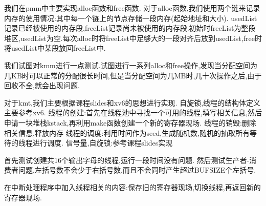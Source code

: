 \documentclass[12pt,letterpaper]{hmcpset}
\begin{document}
	\begin{problem}[1.实现pmm.c]
	\end{problem}
	\begin{solution}
	我们在pmm中主要实现alloc函数和free函数.
	对于alloc函数,我们使用两个链来记录内存的使用情况:其中每一个链上的节点存储一段内存(起始地址和大小). usedList记录已经被使用的内存段,freeList记录尚未被使用的内存段.初始时freeList为整段堆区,usedList为空.每次alloc时将freeList中足够大的一段对齐后放到usedList,free时将usedList中某段放回freeList中.
	\end{solution}

	\begin{problem}[2.测试kmm.c]
	\end{problem}
	\begin{solution}
		我们试图对kmm进行一点测试.试图进行一系列alloc和free操作,发现当分配空间为几KB时可以正常的分配很长时间,但是当分配空间为几MB时,几十次操作之后,由于回收不全,就会出现问题.
	\end{solution}	
	
	\begin{problem}[3.实现kmt.c]
	\end{problem}
	\begin{solution}
		对于kmt,我们主要根据课程slides和xv6的思想进行实现.
		自旋锁,线程的结构体定义主要参考xv6.
		线程的创建:首先在线程池中寻找一个可用的线程,填写相关信息,然后申请一块堆栈kstack,再利用make函数创建一个新的寄存器现场.
		线程的销毁:删除相关信息,释放内存
		线程的调度:利用时间作为seed,生成随机数,随机的抽取所有等待的线程进行调度.
		信号量,自旋锁:参考课程slides实现
	\end{solution}	
	
	\begin{problem}[3.测试kmt.c]
	\end{problem}
	\begin{solution}
		首先测试创建共16个输出字母的线程,运行一段时间没有问题.
		然后测试生产者-消费者问题,左括号数不会少于右括号数,而且不会同时产生超过BUFSIZE个左括号.
	\end{solution}	
	
	\begin{problem}[3.实现os.c]
	\end{problem}
	\begin{solution}
		在中断处理程序中加入线程相关的内容:保存旧的寄存器现场,切换线程,再返回新的寄存器现场.
	\end{solution}	
\end{document}
